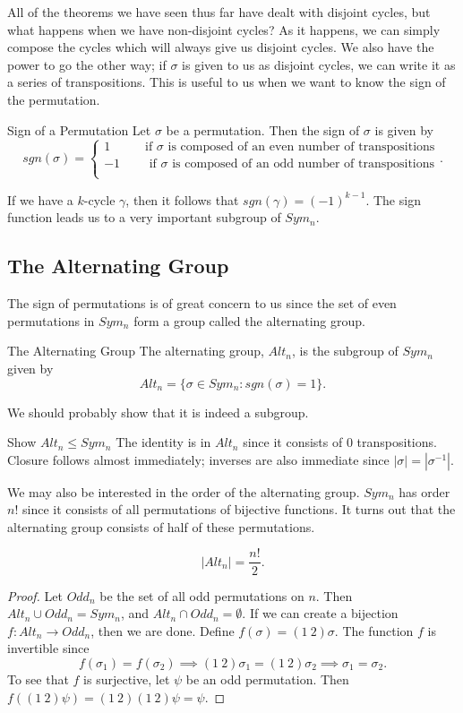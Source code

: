 All of the theorems we have seen thus far have dealt with disjoint cycles, but what happens when we have non-disjoint cycles? As it happens, we can simply compose the cycles which will always give us disjoint cycles. We also have the power to go the other way; if $\sigma$ is given to us as disjoint cycles, we can write it as a series of transpositions. This is useful to us when we want to know the sign of the permutation.

\begin{definition}{Sign of a Permutation}
    Let $\sigma$ be a permutation. Then the sign of $\sigma$ is given by
    \[
        sgn(\sigma)=
        \begin{cases}
            1 \qquad\ \ \text{ if }\sigma\text{ is composed of an even number of transpositions}\\
            -1 \qquad \text{ if }\sigma\text{ is composed of an odd number of transpositions}\\
        \end{cases}.
    \]
\end{definition}
If we have a $k$-cycle $\gamma$, then it follows that $sgn(\gamma)=(-1)^{k-1}$. The sign function leads us to a very important subgroup of $Sym_{n}$.

\subsection*{The Alternating Group}
The sign of permutations is of great concern to us since the set of even permutations in $Sym_{n}$ form a group called the alternating group.

\begin{definition}{The Alternating Group}
    The alternating group, $Alt_{n}$, is the subgroup of $Sym_{n}$ given by
    \[
        Alt_{n}=\{\sigma\in Sym_{n}: sgn(\sigma)=1\}.
    \]
\end{definition}
We should probably show that it is indeed a subgroup.
\begin{example}{Show $Alt_{n}\leq Sym_{n}$}
    The identity is in $Alt_{n}$ since it consists of 0 transpositions. Closure follows almost immediately; inverses are also immediate since $|\sigma|=|\sigma^{-1}|$.
\end{example}

We may also be interested in the order of the alternating group. $Sym_{n}$ has order $n!$ since it consists of all permutations of bijective functions. It turns out that the alternating group consists of half of these permutations.
\begin{theorem}{}
\[
	|Alt_{n}|= \frac{n!}{2}.
\]
\end{theorem}
\begin{proof}
	Let $Odd_{n}$ be the set of all odd permutations on $n$. Then $Alt_{n}\cup Odd_{n}=Sym_{n}$, and $Alt_{n}\cap Odd_{n}=\emptyset$. If we can create a bijection $f:Alt_{n}\to Odd_{n}$, then we are done.
	Define $f(\sigma)=(1\ 2)\sigma$. The function $f$ is invertible since
	\[
		f(\sigma_{1})=f(\sigma_{2})\implies
		(1\ 2)\sigma_{1}=(1\ 2)\sigma_{2}\implies
		\sigma_{1}=\sigma_{2}.
	\]
	To see that $f$ is surjective, let $\psi$ be an odd permutation. Then $f((1\ 2)\psi)=(1\ 2)(1\ 2)\psi=\psi$.
\end{proof}

